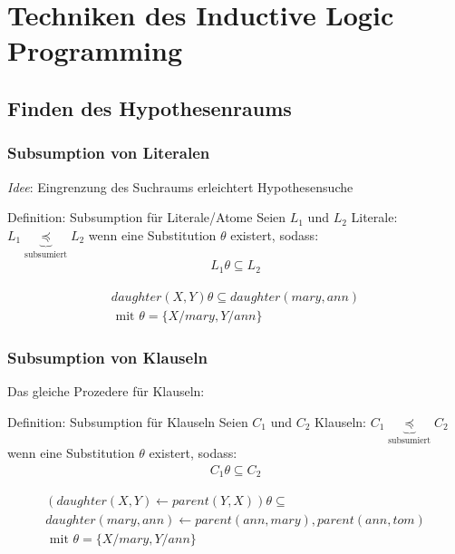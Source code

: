 \section{Techniken des Inductive Logic Programming}
\subsection{Finden des Hypothesenraums}
\begin{frame}
	\frametitle{Subsumption von Literalen}
	\emph{Idee}: Eingrenzung des Suchraums erleichtert Hypothesensuche

	\begin{block}{Definition: Subsumption für Literale/Atome}
		Seien $L_1$ und $L_2$ Literale: $L_1 \underbrace{\preceq}_{\text{subsumiert}} L_2$
		wenn eine Substitution $\theta$ existert, sodass:
		\begin{align*}
			 L_1 \theta \subseteq L_2
		\end{align*}
	\end{block}
	\begin{bsp}
		\begin{align*}
			 daughter(X, Y)\theta\subseteq daughter(mary, ann)\\\text{  mit  } \theta = \{X/mary, Y/ann\}
		\end{align*}
	\end{bsp}
\end{frame}
\begin{frame}
	\frametitle{Subsumption von Klauseln}
	Das gleiche Prozedere für Klauseln:
	\begin{block}{Definition: Subsumption für Klauseln}
		Seien $C_1$ und $C_2$ Klauseln: $C_1 \underbrace{\preceq}_{\text{subsumiert}} C_2$
		wenn eine Substitution $\theta$ existert, sodass:
		\begin{align*}
			 C_1 \theta \subseteq C_2
		\end{align*}
	\end{block}
	\begin{bsp}
		\begin{gather*}
			(daughter(X, Y)\leftarrow parent(Y,X))\theta \subseteq\\
			 daughter(mary, ann) \leftarrow parent(ann, mary), parent(ann, tom)\\
			 \text{  mit  } \theta = \{X/mary, Y/ann\}
		\end{gather*}
	\end{bsp}
\end{frame}

